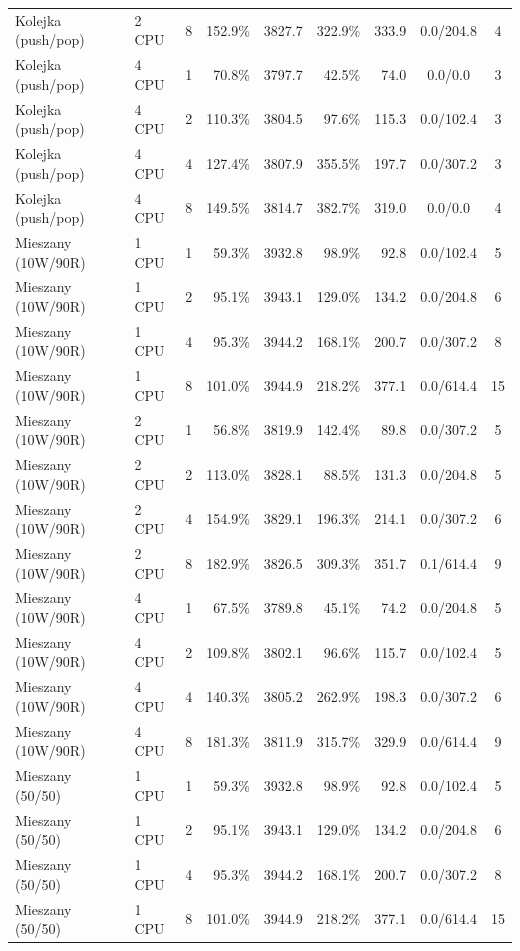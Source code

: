\begin{table}[ht]
{\begin{tabular}{llcrrrrcc}
Kolejka (push/pop) & 2 CPU & 8 & 152.9\% & 3827.7 & 322.9\% & 333.9 & 0.0/204.8 & 4 \\
Kolejka (push/pop) & 4 CPU & 1 & 70.8\% & 3797.7 & 42.5\% & 74.0 & 0.0/0.0 & 3 \\
Kolejka (push/pop) & 4 CPU & 2 & 110.3\% & 3804.5 & 97.6\% & 115.3 & 0.0/102.4 & 3 \\
Kolejka (push/pop) & 4 CPU & 4 & 127.4\% & 3807.9 & 355.5\% & 197.7 & 0.0/307.2 & 3 \\
Kolejka (push/pop) & 4 CPU & 8 & 149.5\% & 3814.7 & 382.7\% & 319.0 & 0.0/0.0 & 4 \\
Mieszany (10W/90R) & 1 CPU & 1 & 59.3\% & 3932.8 & 98.9\% & 92.8 & 0.0/102.4 & 5 \\
Mieszany (10W/90R) & 1 CPU & 2 & 95.1\% & 3943.1 & 129.0\% & 134.2 & 0.0/204.8 & 6 \\
Mieszany (10W/90R) & 1 CPU & 4 & 95.3\% & 3944.2 & 168.1\% & 200.7 & 0.0/307.2 & 8 \\
Mieszany (10W/90R) & 1 CPU & 8 & 101.0\% & 3944.9 & 218.2\% & 377.1 & 0.0/614.4 & 15 \\
Mieszany (10W/90R) & 2 CPU & 1 & 56.8\% & 3819.9 & 142.4\% & 89.8 & 0.0/307.2 & 5 \\
Mieszany (10W/90R) & 2 CPU & 2 & 113.0\% & 3828.1 & 88.5\% & 131.3 & 0.0/204.8 & 5 \\
Mieszany (10W/90R) & 2 CPU & 4 & 154.9\% & 3829.1 & 196.3\% & 214.1 & 0.0/307.2 & 6 \\
Mieszany (10W/90R) & 2 CPU & 8 & 182.9\% & 3826.5 & 309.3\% & 351.7 & 0.1/614.4 & 9 \\
Mieszany (10W/90R) & 4 CPU & 1 & 67.5\% & 3789.8 & 45.1\% & 74.2 & 0.0/204.8 & 5 \\
Mieszany (10W/90R) & 4 CPU & 2 & 109.8\% & 3802.1 & 96.6\% & 115.7 & 0.0/102.4 & 5 \\
Mieszany (10W/90R) & 4 CPU & 4 & 140.3\% & 3805.2 & 262.9\% & 198.3 & 0.0/307.2 & 6 \\
Mieszany (10W/90R) & 4 CPU & 8 & 181.3\% & 3811.9 & 315.7\% & 329.9 & 0.0/614.4 & 9 \\
Mieszany (50/50) & 1 CPU & 1 & 59.3\% & 3932.8 & 98.9\% & 92.8 & 0.0/102.4 & 5 \\
Mieszany (50/50) & 1 CPU & 2 & 95.1\% & 3943.1 & 129.0\% & 134.2 & 0.0/204.8 & 6 \\
Mieszany (50/50) & 1 CPU & 4 & 95.3\% & 3944.2 & 168.1\% & 200.7 & 0.0/307.2 & 8 \\
Mieszany (50/50) & 1 CPU & 8 & 101.0\% & 3944.9 & 218.2\% & 377.1 & 0.0/614.4 & 15 \\

\end{tabular}}
\end{table}
